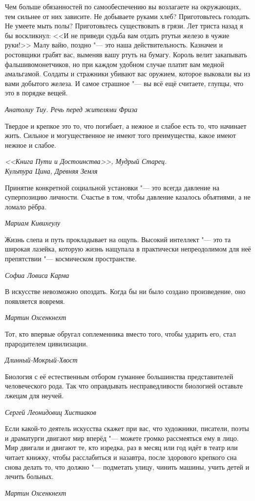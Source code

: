 \documentclass[a4paper,10pt]{book}
\begin{document}
\epigraph{Чем больше обязанностей по самообеспечению вы возлагаете на 
окружающих, тем 
сильнее от них зависите. Не добываете руками хлеб? Приготовьтесь 
голодать. Не умеете мыть полы? Приготовьтесь существовать в грязи. Лет триста 
назад я бы воскликнул: <<И не приведи судьба вам отдать ртуть\footnotemark[3] и 
железо в чужие
руки!>> Малу вайю\footnotemark[4], поздно "--- это наша 
действительность. Казначеи и ростовщики грабят вас, выменяв вашу ртуть на 
бумагу. Король велит закапывать фальшивомонетчиков, но при каждом удобном случае
платит вам медной амальгамой. Солдаты и стражники убивают вас оружием, которое 
выковали вы из вами 
добытого железа. И самое страшное "--- вы всё ещё считаете, глупцы, что это в 
порядке вещей.}
{\textit{Анатолиу Тиу. Речь перед жителями Фриза}}

\epigraph{Твердое и крепкое это то, что погибает, а нежное и слабое есть то,
что начинает жить. Сильное и могущественное не имеют того
преимущества, какое имеют нежное и слабое.}
{\textit{<<Книга Пути и Достоинства>>, Мудрый Старец.\\Культура 
Цина, Древняя Земля}}

\epigraph{Принятие конкретной социальной установки "--- это всегда давление на 
суперпозицию личности. 
Счастье в том, чтобы давление казалось объятиями, а не ломало рёбра.}
{\textit{Мариам Кивихеулу}}

\epigraph{Жизнь слепа и путь прокладывает на ощупь. Высокий интеллект "--- это 
та 
широкая лазейка, которую жизнь нащупала в практически непреодолимом для неё 
препятствии "--- космическом пространстве.}
{\textit{Софиа Ловиса Карма}}

\epigraph{В искусстве невозможно опоздать. Когда бы ни было создано 
произведение, оно появляется вовремя.}
{\textit{Мартин Охсенкнехт}}

\epigraph{Тот, кто впервые обругал соплеменника вместо того, чтобы ударить его, 
стал прародителем цивилизации.}
{\textit{Длинный-Мокрый-Хвост}}



\epigraph{Биология с её естественным отбором гуманнее большинства 
представителей 
человеческого рода. 
Так что оправдывать несправедливости биологией оставьте лжецам для неучей.}
{\textit{Сергей Леонидовиц Хистиаков}}

\epigraph{Если какой-то деятель искусства скажет при вас, что художники, 
писатели, поэты и драматурги двигают мир вперёд "--- можете громко рассмеяться 
ему в лицо. Мир двигали и двигают те, кто изредка, раз в месяц или год идёт в 
театр или читает книжку, чтобы расслабиться и назавтра, после здорового 
крепкого 
сна снова делать то, что должно "--- подметать улицу, чинить машины, учить 
детей 
и лечить больных.}
{\textit{Мартин Охсенкнехт}}
\end{document}
